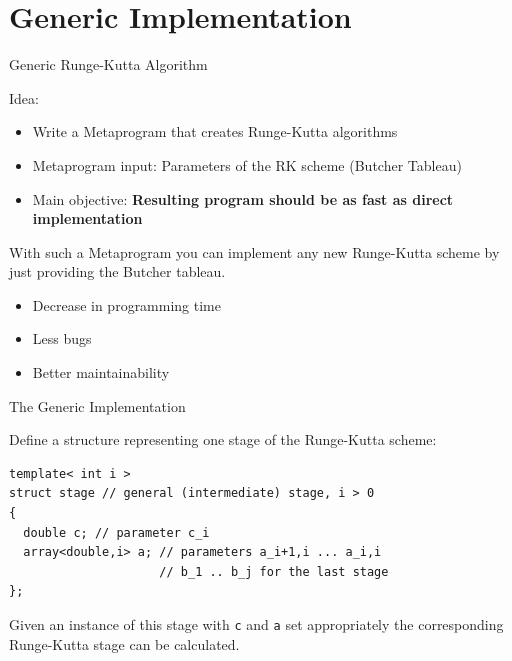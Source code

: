 \documentclass{beamer}
\begin{document}
\section{Generic Implementation}


\begin{frame}{Generic Runge-Kutta Algorithm}
 
\begin{Large}Idea:\end{Large}
  \begin{itemize}
    \item Write a Metaprogram that creates Runge-Kutta algorithms
    \item Metaprogram input: Parameters of the RK scheme (Butcher Tableau)
    \item Main objective: \textbf{Resulting program should be as fast as direct implementation}
  \end{itemize}

\vspace{1em}
With such a Metaprogram you can implement any new Runge-Kutta scheme by just providing the Butcher tableau.

\begin{itemize}
 \item Decrease in programming time
 \item Less bugs
 \item Better maintainability
\end{itemize}

\end{frame}


\begin{frame}[fragile]{The Generic Implementation}

Define a structure representing one stage of the Runge-Kutta scheme:

\begin{lstlisting}
template< int i >
struct stage // general (intermediate) stage, i > 0
{
  double c; // parameter c_i
  array<double,i> a; // parameters a_i+1,i ... a_i,i
                     // b_1 .. b_j for the last stage
};
\end{lstlisting}

Given an instance of this stage with \lstinline+c+ and \lstinline+a+ set appropriately the corresponding Runge-Kutta stage can be calculated. 

\end{frame}
\end{document}
